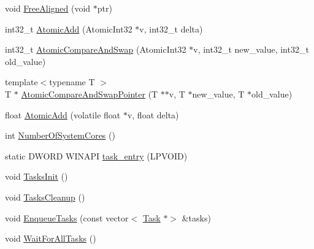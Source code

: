\begin{DoxyCompactItemize}
\item 
void \hyperlink{namespacemage_a401c54df21447c491c527735647b5f80}{Free\+Aligned} (void $\ast$ptr)
\item 
int32\+\_\+t \hyperlink{namespacemage_a56e179559b923b1997495c1bc8e3778e}{Atomic\+Add} (Atomic\+Int32 $\ast$v, int32\+\_\+t delta)
\item 
int32\+\_\+t \hyperlink{namespacemage_a299b0e2de7b6225ad86eab118bca4627}{Atomic\+Compare\+And\+Swap} (Atomic\+Int32 $\ast$v, int32\+\_\+t new\+\_\+value, int32\+\_\+t old\+\_\+value)
\item 
{\footnotesize template$<$typename T $>$ }\\T $\ast$ \hyperlink{namespacemage_a1a36a24cbbc8aea1abb809a10bfdf4d1}{Atomic\+Compare\+And\+Swap\+Pointer} (T $\ast$$\ast$v, T $\ast$new\+\_\+value, T $\ast$old\+\_\+value)
\item 
float \hyperlink{namespacemage_a7c863b965835307770946964a76098ce}{Atomic\+Add} (volatile float $\ast$v, float delta)
\item 
int \hyperlink{namespacemage_ab972a47121b68775bf2545b826a1d5be}{Number\+Of\+System\+Cores} ()
\item 
static D\+W\+O\+RD W\+I\+N\+A\+PI \hyperlink{namespacemage_a9c89df2a328f65db59728cbea3fd1720}{task\+\_\+entry} (L\+P\+V\+O\+ID)
\item 
void \hyperlink{namespacemage_a8252f7acebefd3efe34a15cc51e4a7ac}{Tasks\+Init} ()
\item 
void \hyperlink{namespacemage_a118ddaa5d9606328a0af412c85832e6b}{Tasks\+Cleanup} ()
\item 
void \hyperlink{namespacemage_a0f0fa32534696afa66b313ffebbf9caf}{Enqueue\+Tasks} (const vector$<$ \hyperlink{classmage_1_1_task}{Task} $\ast$$>$ \&tasks)
\item 
void \hyperlink{namespacemage_a7da78c39175a029c92ed42d8fb9f30af}{Wait\+For\+All\+Tasks} ()
\end{DoxyCompactItemize}
